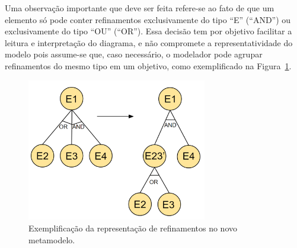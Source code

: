 Uma observação importante que deve ser feita refere-se ao fato de que um elemento só pode conter refinamentos exclusivamente do tipo ``E'' (``AND'') ou exclusivamente do tipo ``OU'' (``OR''). Essa decisão tem por objetivo facilitar a leitura e interpretação do diagrama, e não compromete a representatividade do modelo pois assume-se que, caso necessário, o modelador pode agrupar refinamentos do mesmo tipo em um objetivo, como exemplificado na Figura~\ref{figura-refinamentos}.

\begin{figure}
	\centering
	\includegraphics[width=0.7\textwidth]{figuras/metamodelos/exemplo-or-and.png}
	\caption{Exemplificação da representação de refinamentos no novo metamodelo.}
	\label{figura-refinamentos}
\end{figure}